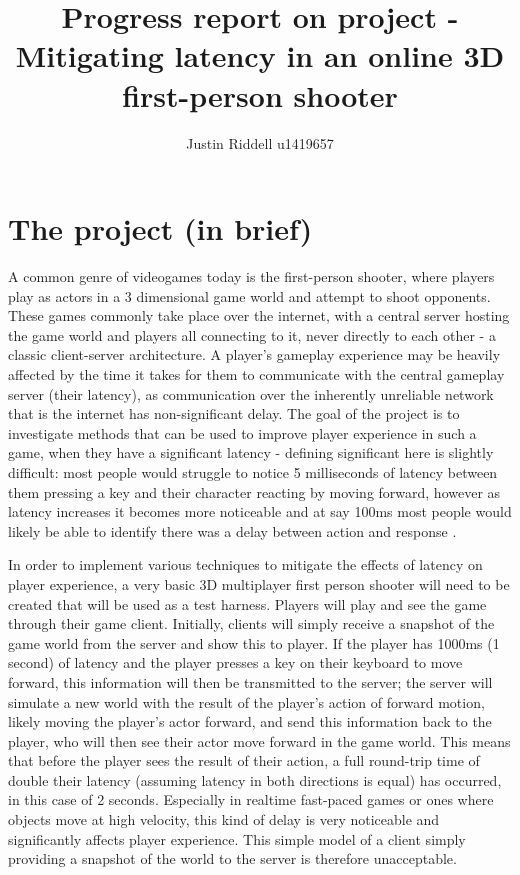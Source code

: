 \documentclass[titlepage]{article}
\title{Progress report on project - Mitigating latency in an online 3D first-person shooter}
\author{Justin Riddell u1419657}
\begin{document}
\maketitle

\section{The project (in brief)}

	A common genre of videogames today is the first-person shooter, where players play as actors in a 3 dimensional game world and attempt to shoot opponents. These games commonly take place over the internet, with a central server hosting the game world and players all connecting to it, never directly to each other - a classic client-server architecture. A player's gameplay experience may be heavily affected by the time it takes for them to communicate with the central gameplay server (their latency), as communication over the inherently unreliable network that is the internet has non-significant delay. The goal of the project is to investigate methods that can be used to improve player experience in such a game, when they have a significant latency - defining significant here is slightly difficult: most people would struggle to notice 5 milliseconds of latency between them pressing a key and their character reacting by moving forward, however as latency increases it becomes more noticeable and at say 100ms most people would likely be able to identify there was a delay between action and response \cite{Nielsen}.

	In order to implement various techniques to mitigate the effects of latency on player experience, a very basic 3D multiplayer first person shooter will need to be created that will be used as a test harness. Players will play and see the game through their game client. Initially, clients will simply receive a snapshot of the game world from the server and show this to player. If the player has 1000ms (1 second) of latency and the player presses a key on their keyboard to move forward, this information will then be transmitted to the server; the server will simulate a new world with the result of the player's action of forward motion, likely moving the player's actor forward, and send this information back to the player, who will then see their actor move forward in the game world. This means that before the player sees the result of their action, a full round-trip time of double their latency (assuming latency in both directions is equal) has occurred, in this case of 2 seconds. Especially in realtime fast-paced games or ones where objects move at high velocity, this kind of delay is very noticeable and significantly affects player experience. This simple model of a client simply providing a snapshot of the world to the server is therefore unacceptable.
	
\end{document}
